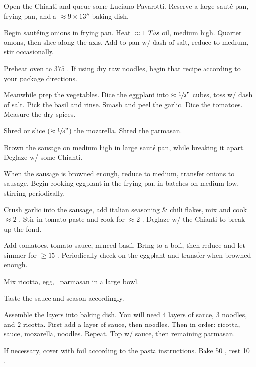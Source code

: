 \begin{preparation}
\item Open the Chianti and queue some Luciano Pavarotti.
    Reserve a large saut\'{e} pan, frying pan, and a $\approx 9\times13''$ baking dish.

\item Begin saut\'{e}ing onions in frying pan.
    Heat $\approx 1$ $Tbs$ oil, medium high.
    Quarter onions, then slice along the axis.
    Add to pan w/ dash of salt, reduce to medium, stir occasionally.

\item Preheat oven to $375$ \Fahrenheit.
    If using dry raw noodles, begin that recipe according to your package directions.

\item Meanwhile prep the vegetables.
    Dice the eggplant into $\approx \sfrac{1}{2} "$ cubes, toss w/ dash of salt.
    Pick the basil and rinse.
    Smash and peel the garlic.
    Dice the tomatoes.
    Measure the dry spices.

\item Shred or slice ($\approx \sfrac{1}{8} "$) the mozarella.
    Shred the parmasan.

\item Brown the sausage on medium high in large saut\'{e} pan, while breaking it apart.
    Deglaze w/ some Chianti.

\item When the sausage is browned enough, reduce to medium, transfer onions to sausage.
    Begin cooking eggplant in the frying pan in batches on medium low, stirring periodically.

\item Crush garlic into the sausage, add italian seasoning \& chili flakes, mix and cook $\approx 2$ \minute.
    Stir in tomato paste and cook for $\approx 2$ \minute.
    Deglaze w/ the Chianti to break up the fond.

\item Add tomatoes, tomato sauce, minced basil.
    Bring to a boil, then reduce and let simmer for $\geq 15$ \minute.
    Periodically check on the eggplant and transfer when browned enough.

\item Mix ricotta, egg, \onehalf~parmasan in a large bowl.

\item Taste the sauce and season accordingly.

\item Assemble the layers into baking dish.
    You will need 4 layers of sauce, 3 noodles, and 2 ricotta.
    First add a layer of sauce, then noodles.
    Then in order: ricotta, sauce, mozarella, noodles.
    Repeat.
    Top w/ sauce, then remaining parmasan.

\item If necessary, cover with foil according to the pasta instructions.
    Bake 50 \minute, rest 10 \minute.
\end{preparation}

